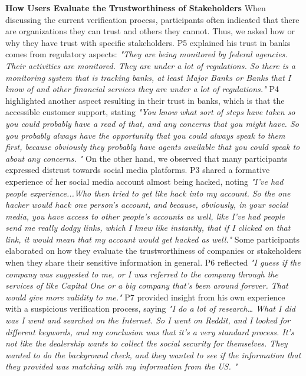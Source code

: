 \textbf{How Users Evaluate the Trustworthiness of Stakeholders} When discussing the current verification process, participants often indicated that there are organizations they can trust and others they cannot. Thus, we asked how or why they have trust with specific stakeholders. P5 explained his trust in banks comes from regulatory aspects: \textit{"They are being monitored by federal agencies. Their activities are monitored. They are under a lot of regulations. So there is a monitoring system that is tracking banks, at least Major Banks or Banks that I know of and other financial services they are under a lot of regulations."} P4 highlighted another aspect resulting in their trust in banks,  which is that the accessible customer support, stating \textit{"You know what sort of steps have taken so you could probably have a read of that, and any concerns that you might have. So you probably always have the opportunity that you could always speak to them first, because obviously they probably have agents available that you could speak to about any concerns. "} On the other hand, we observed that many participants expressed distrust towards social media platforms. P3 shared a formative experience of her social media account almost being hacked, noting \textit{"I've had people experience...Who then tried to get like hack into my account. So the one hacker would hack one person's account, and because, obviously, in your social media, you have access to other people's accounts as well, like I've had people send me really dodgy links, which I knew like instantly, that if I clicked on that link, it would mean that my account would get hacked as well."} Some participants elaborated on how they evaluate the trustworthiness of companies or stakeholders when they share their sensitive information in general. P6 reflected \textit{"I guess if the company was suggested to me, or I was referred to the company through the services of like Capital One or a big company that's been around forever. That would give more validity to me."} P7 provided insight from his own experience with a suspicious verification process, saying \textit{"I do a lot of research… What I did was I went and searched on the Internet. So I went on Reddit, and I looked for different keywords, and my conclusion was that it's a very standard process. It's not like the dealership wants to collect the social security for themselves. They wanted to do the background check, and they wanted to see if the information that they provided was matching with my information from the US. "}
\fi


